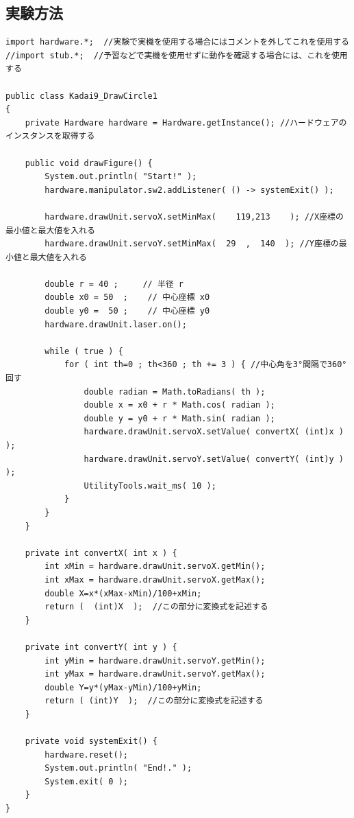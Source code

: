 \documentclass{jarticle}
\begin{document}
\subsection{実験方法}
\begin{lstlisting}[caption=DrawCircle1]
  import hardware.*;  //実験で実機を使用する場合にはコメントを外してこれを使用する
//import stub.*;  //予習などで実機を使用せずに動作を確認する場合には、これを使用する

public class Kadai9_DrawCircle1
{
    private Hardware hardware = Hardware.getInstance(); //ハードウェアのインスタンスを取得する

    public void drawFigure() {
        System.out.println( "Start!" );
        hardware.manipulator.sw2.addListener( () -> systemExit() );

        hardware.drawUnit.servoX.setMinMax(    119,213    ); //X座標の最小値と最大値を入れる
        hardware.drawUnit.servoY.setMinMax(  29  ,  140  ); //Y座標の最小値と最大値を入れる

        double r = 40 ;     // 半径 r
        double x0 = 50  ;    // 中心座標 x0
        double y0 =  50 ;    // 中心座標 y0
        hardware.drawUnit.laser.on();

        while ( true ) {
            for ( int th=0 ; th<360 ; th += 3 ) { //中心角を3°間隔で360°回す
                double radian = Math.toRadians( th );
                double x = x0 + r * Math.cos( radian );
                double y = y0 + r * Math.sin( radian );
                hardware.drawUnit.servoX.setValue( convertX( (int)x ) );
                hardware.drawUnit.servoY.setValue( convertY( (int)y ) );
                UtilityTools.wait_ms( 10 );
            }
        }
    }

    private int convertX( int x ) {
        int xMin = hardware.drawUnit.servoX.getMin();
        int xMax = hardware.drawUnit.servoX.getMax();
        double X=x*(xMax-xMin)/100+xMin;
        return (  (int)X  );  //この部分に変換式を記述する
    }

    private int convertY( int y ) {
        int yMin = hardware.drawUnit.servoY.getMin();
        int yMax = hardware.drawUnit.servoY.getMax();
        double Y=y*(yMax-yMin)/100+yMin;
        return ( (int)Y  );  //この部分に変換式を記述する
    }

    private void systemExit() {
        hardware.reset();
        System.out.println( "End!." );
        System.exit( 0 );
    }
}

\end{lstlisting}
\end{document}
